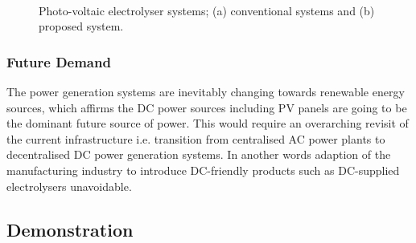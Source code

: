 \documentclass[1pt]{extarticle}
\begin{document}
\begin{figure}[h!]
    \begin{center}
    \\
    \caption{Photo-voltaic electrolyser systems; (a) conventional systems and (b) proposed system.}
    \label{F_FIG1}
    \end{center}
\end{figure}

\subsubsection{Future Demand}
 
The power generation systems are inevitably changing towards renewable energy sources, which affirms the DC power sources including PV panels are going to be the dominant future source of power. This would require an overarching revisit of the current infrastructure i.e. transition from centralised AC power plants to decentralised DC power generation systems. In another words adaption of the manufacturing industry to introduce DC-friendly products such as DC-supplied electrolysers unavoidable.    
 
\subsection{Demonstration}
\end{document}
